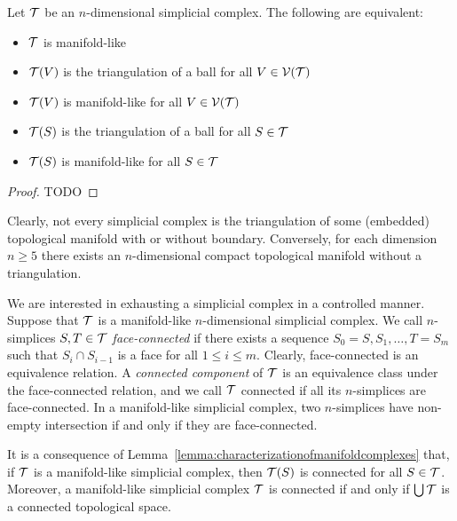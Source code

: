 \documentclass[a4paper]{article}
\begin{document}
\begin{lemma}\label{lemma:characterizationofmanifoldcomplexes}
    Let ${\mathcal T}$ be an $n$-dimensional simplicial complex. The following are equivalent:
    \begin{itemize}
     \item ${\mathcal T}$ is manifold-like
     \item ${\mathcal T}(V)$ is the triangulation of a ball for all $V \in {\mathcal V}({\mathcal T})$
     \item ${\mathcal T}(V)$ is manifold-like for all $V \in {\mathcal V}({\mathcal T})$
     \item ${\mathcal T}(S)$ is the triangulation of a ball for all $S \in {\mathcal T}$
     \item ${\mathcal T}(S)$ is manifold-like for all $S \in {\mathcal T}$
    \end{itemize}
\end{lemma}
\begin{proof}
    \color{red} TODO
\end{proof}



\begin{remark}
    Clearly, not every simplicial complex is the triangulation of some (embedded) topological manifold with or without boundary. 
    Conversely, for each dimension $n \geq 5$ there exists an $n$-dimensional compact topological manifold without a triangulation. %
\end{remark}


We are interested in exhausting a simplicial complex in a controlled manner. 
Suppose that ${\mathcal T}$ is a manifold-like $n$-dimensional simplicial complex. 
We call $n$-simplices $S,T \in {\mathcal T}$ \emph{face-connected} if there exists a sequence $S_0=S,S_1,\dots,T=S_m$ such that $S_{i} \cap S_{i-1}$ is a face for all $1 \leq i \leq m$. Clearly, face-connected is an equivalence relation. A \emph{connected component} of ${\mathcal T}$ is an equivalence class under the face-connected relation, and we call ${\mathcal T}$ connected if all its $n$-simplices are face-connected. 
In a manifold-like simplicial complex, two $n$-simplices have non-empty intersection if and only if they are face-connected. 

It is a consequence of Lemma~\ref{lemma:characterizationofmanifoldcomplexes} that,
if ${\mathcal T}$ is a manifold-like simplicial complex, then ${\mathcal T}(S)$ is connected for all $S \in {\mathcal T}$.
Moreover, a manifold-like simplicial complex ${\mathcal T}$ is connected if and only if $\bigcup{\mathcal T}$ is a connected topological space. 
\end{document}
